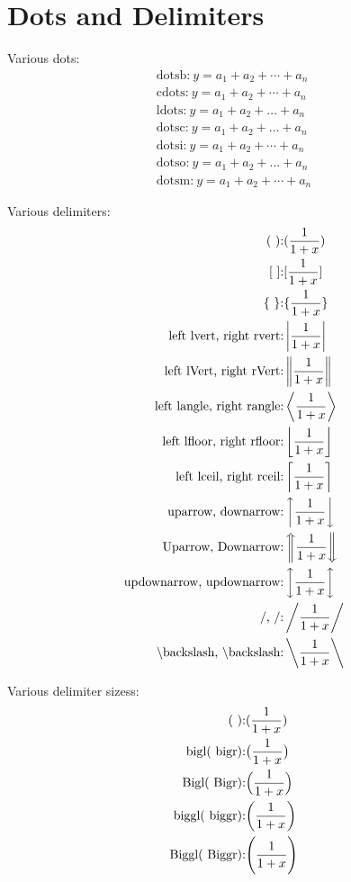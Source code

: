 \documentclass{scrartcl}
\begin{document}
\section{Dots and Delimiters}

Various dots:
\begin{align*}
    \text{dotsb:}\ y = a_1 + a_2 + \dotsb + a_n\\
    \text{cdots:}\ y = a_1 + a_2 + \cdots + a_n\\
    \text{ldots:}\ y = a_1 + a_2 + \ldots + a_n\\
    \text{dotsc:}\ y = a_1 + a_2 + \dotsc + a_n\\
    \text{dotsi:}\ y = a_1 + a_2 + \dotsi + a_n\\
    \text{dotso:}\ y = a_1 + a_2 + \dotso + a_n\\
    \text{dotsm:}\ y = a_1 + a_2 + \dotsm + a_n
\end{align*}

Various delimiters:
\begin{align*}
    \text{( ):}   &(\frac{1}{1+x}) \\
    \text{[ ]:}   &[\frac{1}{1+x}] \\
    \text{\{ \}:} &\{\frac{1}{1+x}\} \\
    \text{left lvert, right rvert:} &\left\lvert\frac{1}{1+x}\right\rvert \\
    \text{left lVert, right rVert:} &\left\lVert\frac{1}{1+x}\right\rVert \\
    \text{left langle, right rangle:} &\left\langle\frac{1}{1+x}\right\rangle\\
    \text{left lfloor, right rfloor:} &\left\lfloor\frac{1}{1+x}\right\rfloor\\
    \text{left lceil, right rceil:} &\left\lceil\frac{1}{1+x}\right\rceil\\
    \text{uparrow, downarrow:} &\left\uparrow\frac{1}{1+x}\right\downarrow\\
    \text{Uparrow, Downarrow:} &\left\Uparrow\frac{1}{1+x}\right\Downarrow\\
    \text{updownarrow, updownarrow:} &\left\updownarrow\frac{1}{1+x}\right\updownarrow\\
    \text{/, /:} &\left/\frac{1}{1+x}\right/\\
    \text{\textbackslash backslash, \textbackslash backslash:} &\left\backslash\frac{1}{1+x}\right\backslash\\
\end{align*}

Various delimiter sizess:
\begin{align*}
    \text{( ):}   &(\frac{1}{1+x}) \\
    \text{bigl( bigr):}   &\bigl(\frac{1}{1+x}\bigr) \\
    \text{Bigl( Bigr):}   &\Bigl(\frac{1}{1+x}\Bigr) \\
    \text{biggl( biggr):}   &\biggl(\frac{1}{1+x}\biggr) \\
    \text{Biggl( Biggr):}   &\Biggl(\frac{1}{1+x}\Biggr) \\
\end{align*}
\end{document}
